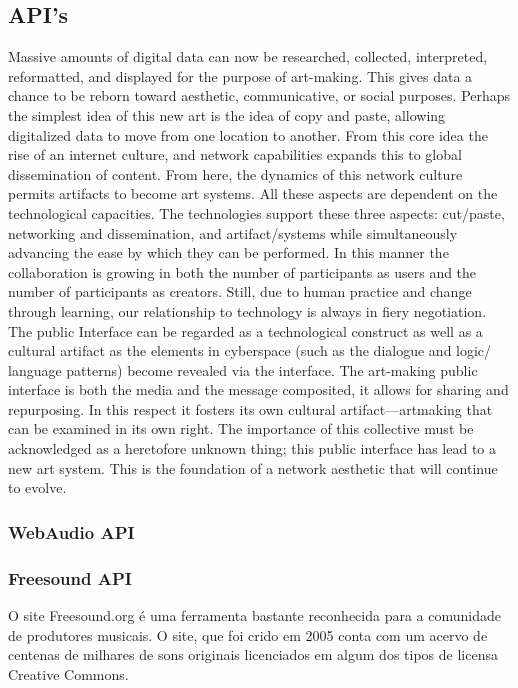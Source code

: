 
\subsection{API's}
\begin{citacao}
Massive amounts of digital data can now be researched, collected, interpreted, reformatted, and displayed for the purpose of art-making. This gives data a chance to be reborn toward aesthetic, communicative, or social purposes. Perhaps the simplest idea of this new art is the idea of copy and paste, allowing digitalized data to move from one location to another. From this core idea the rise of an internet culture, and network capabilities expands this to global dissemination of content. From here, the dynamics of this network culture permits artifacts to become art systems. All these aspects are dependent on the technological capacities. The technologies support these three aspects: cut/paste, networking and dissemination, and artifact/systems while simultaneously advancing the ease by which they can be performed. In this manner the collaboration is growing in both the number of participants as users and the number of participants as creators. Still, due to human practice and change through learning, our relationship to technology is always in fiery negotiation. The public Interface can be regarded as a technological construct as well as a cultural artifact as the elements in cyberspace (such as the dialogue and logic/ language patterns) become revealed via the interface. The art-making public interface is both the media and the message composited, it allows for sharing and repurposing. In this respect it fosters its own cultural artifact—artmaking that can be examined in its own right. The importance of this collective must be acknowledged as a heretofore unknown thing; this public interface has lead to a new art system. This is the foundation of a network aesthetic that will continue to evolve.
\cite[5]{Soon2011}
\end{citacao}

\subsubsection{WebAudio API}

\subsubsection{Freesound API}
O site Freesound.org \cite{Font2013} é uma ferramenta bastante reconhecida para a comunidade de produtores musicais. O site, que foi crido em 2005 conta com um acervo de centenas de milhares de sons originais licenciados em algum dos tipos de licensa Creative Commons. 

